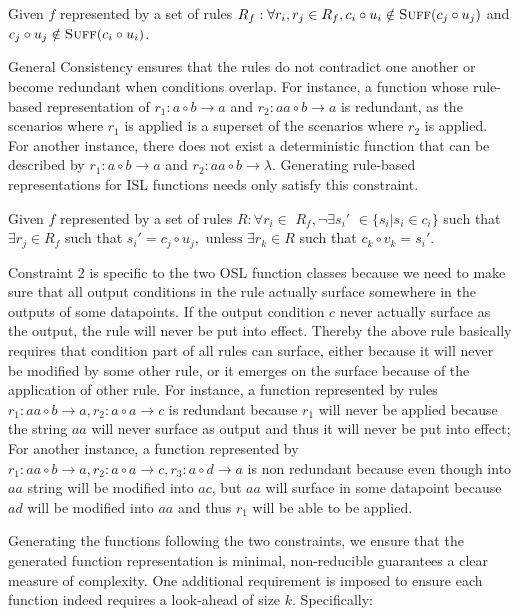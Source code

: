\begin{definition}
Given $f$ represented by a set of rules $R_f: \forall r_i, r_j\in R_f, c_i\circ u_i\notin\textsc{Suff}(c_j\circ u_j)$ and $c_j\circ u_j\notin\textsc{Suff}(c_i\circ u_i)$.
\end{definition}

General Consistency ensures that the rules do not contradict one another or become redundant when conditions overlap. For instance, a function whose rule-based representation of $r_1: a\circ b\to a$ and $r_2: aa\circ b\to a$ is redundant, as the scenarios where $r_1$ is applied is a superset of the scenarios where $r_2$ is applied. For another instance, there does not exist a deterministic function that can be described by $r_1: a\circ b\to a$ and $r_2: aa\circ b\to \lambda$. Generating rule-based representations for ISL functions needs only satisfy this constraint.

\begin{definition}
Given $f$ represented by a set of rules $R:\forall r_i\in $ $R_f, \lnot\exists s_i'$ ${\in}\{s_i|s_i {\in} c_i\}$ such that $ \exists r_j\in R_f$ such that $ s_i' = c_j\circ u_j, \text{ unless }\exists r_k\in R$ such that $c_k\circ v_k = s_i'$.
\end{definition}

Constraint 2 is specific to the two OSL function classes because we need to make sure that all output conditions in the rule actually surface somewhere in the outputs of some datapoints. If the output condition $c$ never actually surface as the output, the rule will never be put into effect. Thereby the above rule basically requires that condition part of all rules can surface, either because it will never be modified by some other rule, or it emerges on the surface because of the application of other rule. For instance, a function represented by rules $r_1: aa\circ b\to a, r_2: a\circ a\to c$ is redundant because $r_1$ will never be applied because the string $aa$ will never surface as output and thus it will never be put into effect; For another instance, a function represented by $r_1: aa\circ b\to a, r_2: a\circ a\to c, r_3: a\circ d\to a$ is non redundant because even though into $aa$ string will be modified into $ac$, but $aa$ will surface in some datapoint because $ad$ will be modified into $aa$ and thus $r_1$ will be able to be applied.

Generating the functions following the two constraints, we ensure that the generated function representation is minimal, non-reducible guarantees a clear measure of complexity. One additional requirement is imposed to ensure each function indeed requires a look-ahead of size $k$. Specifically:

